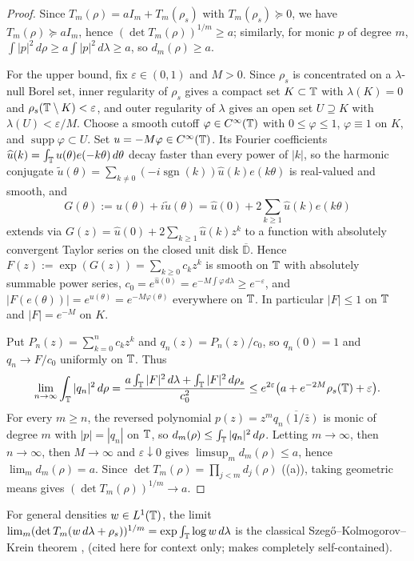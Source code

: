 \documentclass[11pt]{article}
\DeclareMathOperator{\supp}{supp}
\DeclareMathOperator{\sgn}{sgn}
\begin{document}
\begin{proof}
Since $T_m(\rho)=aI_m+T_m(\rho_s)$ with $T_m(\rho_s)\succeq0$, we have $T_m(\rho)\succeq aI_m$, hence $(\det T_m(\rho))^{1/m}\ge a$; similarly, for monic $p$ of degree $m$, $\int|p|^2\,d\rho\ge a\int|p|^2\,d\lambda\ge a$, so $d_m(\rho)\ge a$.

For the upper bound, fix $\varepsilon\in(0,1)$ and $M>0$. Since $\rho_s$ is concentrated on a $\lambda$-null Borel set, inner regularity of $\rho_s$ gives a compact set $K\subset\mathbb T$ with $\lambda(K)=0$ and $\rho_s(\mathbb T\setminus K)<\varepsilon$, and outer regularity of $\lambda$ gives an open set $U\supseteq K$ with $\lambda(U)<\varepsilon/M$. Choose a smooth cutoff $\varphi\in C^\infty(\mathbb T)$ with $0\le\varphi\le1$, $\varphi\equiv1$ on $K$, and $\supp\varphi\subset U$. Set $u=-M\varphi\in C^\infty(\mathbb T)$. Its Fourier coefficients $\widehat{u}(k)=\int_{\mathbb T}u(\theta)e(-k\theta)\,d\theta$ decay faster than every power of $|k|$, so the harmonic conjugate $\tilde u(\theta)=\sum_{k\ne0}(-i\sgn(k))\widehat{u}(k)e(k\theta)$ is real-valued and smooth, and
\[
G(\theta):=u(\theta)+i\tilde u(\theta)=\widehat{u}(0)+2\sum_{k\ge1}\widehat{u}(k)e(k\theta)
\]
extends via $G(z)=\widehat{u}(0)+2\sum_{k\ge1}\widehat{u}(k)z^k$ to a function with absolutely convergent Taylor series on the closed unit disk $\overline{\mathbb D}$. Hence $F(z):=\exp(G(z))=\sum_{k\ge0}c_kz^k$ is smooth on $\mathbb T$ with absolutely summable power series, $c_0=e^{\widehat{u}(0)}=e^{-M\int\varphi\,d\lambda}\ge e^{-\varepsilon}$, and $|F(e(\theta))|=e^{u(\theta)}=e^{-M\varphi(\theta)}$ everywhere on $\mathbb T$. In particular $|F|\le1$ on $\mathbb T$ and $|F|=e^{-M}$ on $K$.

Put $P_n(z)=\sum_{k=0}^n c_kz^k$ and $q_n(z)=P_n(z)/c_0$, so $q_n(0)=1$ and $q_n\to F/c_0$ uniformly on $\mathbb T$. Thus
\[
\lim_{n\to\infty}\int_{\mathbb T}|q_n|^2\,d\rho
=\frac{a\int_{\mathbb T}|F|^2\,d\lambda+\int_{\mathbb T}|F|^2\,d\rho_s}{c_0^2}
\le e^{2\varepsilon}\bigl(a+e^{-2M}\rho_s(\mathbb T)+\varepsilon\bigr).
\]
For every $m\ge n$, the reversed polynomial $p(z)=z^m\overline{q_n(1/\bar z)}$ is monic of degree $m$ with $|p|=|q_n|$ on $\mathbb T$, so $d_m(\rho)\le\int_{\mathbb T}|q_n|^2\,d\rho$. Letting $m\to\infty$, then $n\to\infty$, then $M\to\infty$ and $\varepsilon\downarrow0$ gives $\limsup_m d_m(\rho)\le a$, hence $\lim_m d_m(\rho)=a$. Since $\det T_m(\rho)=\prod_{j<m}d_j(\rho)$ ((a)), taking geometric means gives $(\det T_m(\rho))^{1/m}\to a$.
\end{proof}

For general densities $w\in L^1(\mathbb T)$, the limit $\lim_m(\det T_m(w\,d\lambda+\rho_s))^{1/m}=\exp\int_{\mathbb T}\log w\,d\lambda$ is the classical Szeg\H{o}--Kolmogorov--Krein theorem \cite[Chapter~3]{GrenanderSzego58}, \cite[Chapter~2]{Simon05} (cited here for context only;  makes  completely self-contained).
\end{document}
